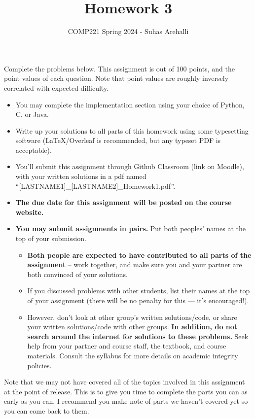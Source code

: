 \documentclass{exam}
\title{Homework 3}
\author{COMP221 Spring 2024 - Suhas Arehalli}
\date{}
\begin{document}
\maketitle

Complete the problems below. This assignment is out of 100 points, and the point values of each question. Note that point values are roughly inversely correlated with expected difficulty.

\begin{itemize}
    \item You may complete the implementation section using your choice of Python, C, or Java.
    \item Write up your solutions to all parts of this homework using some typesetting software (LaTeX/Overleaf is recommended, but any typeset PDF is acceptable).
    \item You'll submit this assignment through Github Classroom (link on Moodle), with your written solutions in a pdf named ``[LASTNAME1]\_[LASTNAME2]\_Homework1.pdf''.
    \item \textbf{The due date for this assignment will be posted on the course website.}
    \item \textbf{You may submit assignments in pairs.} Put both peoples' names at the top of your submission. \begin{itemize}
        \item \textbf{Both people are expected to have contributed to all parts of the assignment} -- work together, and make sure you and your partner are both convinced of your solutions.
        \item If you discussed problems with other students, list their names at the top of your assignment (there will be no penalty for this --- it's encouraged!).
        \item However, don't look at other group's written solutions/code, or share your written solutions/code with other groups. \textbf{In addition, do not search around the internet for solutions to these problems.} Seek help from your partner and course staff, the textbook, and course materials. Consult the syllabus for more details on academic integrity policies.
    \end{itemize}  
\end{itemize}   

Note that we may not have covered all of the topics involved in this assignment at the point of release. This is to give you time to complete the parts you can as early as you can. I recommend you make note of parts we haven't covered yet so you can come back to them.
\end{document}
